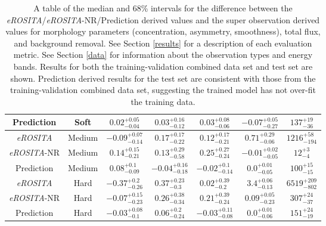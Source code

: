 \documentclass[twocolumn, 11pt]{aastex63}%
\begin{document}
\begin{table}[h!]
\begin{tabular}{||c c c c c c c||}
 Prediction & Soft & $0.02_{-0.04}^{+0.05}$ & $0.03_{-0.12}^{+0.16}$ & $0.03_{-0.06}^{+0.08}$ & $-0.07_{-0.27}^{+0.05}$& $137_{-36}^{+19}$ \\[1ex]
 \hline
 \textit{eROSITA} & Medium & $-0.09_{-0.14}^{+0.07}$ & $0.17_{-0.22}^{+0.17}$ & $0.12_{-0.21}^{+0.17}$ & $0.71_{-0.06}^{+0.29}$& $1216_{-194}^{+58}$ \\[1ex] 
 \textit{eROSITA}-NR & Medium & $0.14_{-0.21}^{+0.15}$ & $0.13_{-0.58}^{+0.29}$ & $0.25_{-0.24}^{+0.27}$ & $-0.01_{-0.05}^{+0.02}$& $12_{-4}^{+3}$ \\[1ex]
 Prediction & Medium & $0.08_{-0.09}^{+0.1}$ & $-0.04_{-0.18}^{+0.16}$ & $-0.02_{-0.14}^{+0.1}$ & $0.0_{-0.05}^{+0.01}$& $100_{-15}^{+15}$ \\[1ex]
 \hline
 \textit{eROSITA} & Hard & $-0.37_{-0.26}^{+0.2}$ & $0.37_{-0.3}^{+0.23}$ & $0.02_{-0.2}^{+0.39}$ & $3.4_{-0.13}^{+0.06}$& $6519_{-802}^{+209}$\\[1ex] 
 \textit{eROSITA}-NR & Hard & $-0.07_{-0.23}^{+0.15}$ & $0.26_{-0.34}^{+0.38}$ & $0.21_{-0.24}^{+0.39}$ & $0.09_{-0.23}^{+0.05}$& $307_{-37}^{+24}$ \\[1ex]
 Prediction & Hard & $-0.03_{-0.1}^{+0.08}$ & $0.06_{-0.24}^{+0.2}$ & $-0.03_{-0.08}^{+0.11}$ & $0.0_{-0.06}^{+0.01}$& $151_{-19}^{+24}$ \\[1ex]
 \hline
 \end{tabular}
 \caption{\label{tab:training_v_test} A table of the median and 68\% intervals for the difference between the \textit{eROSITA}/\textit{eROSITA}-NR/Prediction derived values and the super observation derived values for morphology parameters (concentration, asymmetry, smoothness), total flux, and background removal. See Section \ref{results} for a description of each evaluation metric. See Section \ref{data} for information about the observation types and energy bands. Results for both the training-validation combined data set and test set are shown. Prediction derived results for the test set are consistent with those from the training-validation combined data set, suggesting the trained model has not over-fit the training data.}
\end{table}
\end{document}
